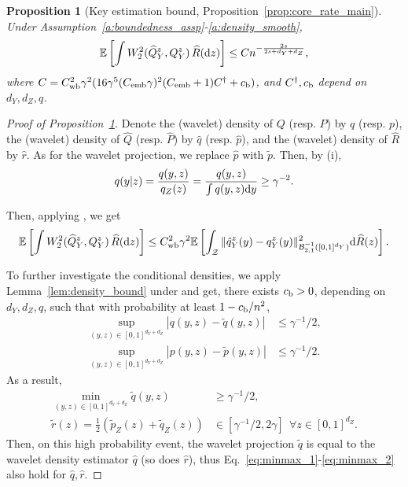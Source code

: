 \documentclass{article}
\theoremstyle{plain}
\newtheorem{proposition}{Proposition}[section]
\theoremstyle{definition}
\def\EE{\mathbb{E}}
\def\QQ{Q}
\def\calB{\mathcal{B}}
\def\calZ{\mathcal{Z}}
\theoremstyle{plain}
\newcommand{\diff}{{\rm d}}
\def\EE{\mathbb{E}}
\def\calB{\mathcal{B}}
\def\calZ{\mathcal{Z}}
\begin{document}
\begin{proposition}[Key estimation bound, Proposition~\ref{prop:core_rate_main}]\label{prop:core_rate}
Under Assumption~\ref{a:boundedness_assp}-\ref{a:density_smooth},
    \[
        \EE\left[\int W^2_2(\widehat \QQ_Y^z, \QQ_Y^z) \, \widehat R(\diff z)\right] \leq C n^{-\frac{2s}{2s+d_Y+d_Z}},
    \]
    where $C = C_{\textup{wb}}^2 \gamma^2(16 \gamma^5  (C_{\textup{emb}} \gamma)^2 (C_{\textup{emb}} + 1)C^\dagger + c_{\textup{b}})$, and $C^\dagger ,c_{\textup{b}}$ depend on $d_Y, d_Z, q$.
\end{proposition}

\begin{proof}[Proof of Proposition~\ref{prop:core_rate}]
    Denote the (wavelet) density of $Q$ (resp. $P$) by $q$ (resp. $p$), the (wavelet) density of $\widehat Q$ (resp. $\widehat P$) by $\hat q$ (resp. $\hat p$), and the (wavelet) density of $\widehat R$ by $\hat r$. As for the wavelet projection, we replace $\hat p$ with $\tilde p$. Then, by (i),
    \[
        q(y|z) = \frac{q(y,z)}{q_Z(z)} = \frac{q(y,z)}{\int q(y,z) \diff y} \geq \gamma^{-2}.
    \]    
    
    Then, applying , we get
    \[
        \EE\left[\int W^2_2(\widehat \QQ_Y^z, \QQ_Y^z) \, \widehat R(\diff z)\right] \leq C_{\textup{wb}}^2 \gamma^2 \EE\left[\int_{\calZ} \|\hat q_Y^z(y) - q_Y^z(y)\|^2_{\calB_{2,1}^{-1}([0,1]^{d_Y})} \diff \widehat R(z)\right].
    \]

    To further investigate the conditional densities, we apply Lemma~\ref{lem:density_bound} under  and get, there exists $c_{\textup{b}} > 0$, depending on $d_Y, d_Z, q$, such that with probability at least $1 - c_{\textup{b}} / n^2$, 
    \begin{align*}
        \sup_{(y,z) \in [0,1]^{d_Y + d_Z}} |q(y, z) - \tilde q(y, z)| &\leq \gamma^{-1}/2,\\
        \sup_{(y,z) \in [0,1]^{d_Y + d_Z}} |p(y, z) - \tilde p(y, z)| &\leq \gamma^{-1}/2.
    \end{align*}
    As a result,
    \begin{align}
        \min_{(y,z) \in [0,1]^{d_Y + d_Z}} \tilde q(y,z) &\geq \gamma^{-1}/2, \label{eq:minmax_1}\\
        \tilde r(z) = \frac{1}{2}( \tilde p_Z(z) + \tilde q_Z(z)) & \in [\gamma^{-1}/2, 2\gamma] \ \  \forall z \in [0,1]^{d_Z}. \label{eq:minmax_2}
    \end{align}
    Then, on this high probability event, the wavelet projection $\tilde q$ is equal to the wavelet density estimator $\hat q$ (so does $\hat r$), thus Eq.~\eqref{eq:minmax_1}-\eqref{eq:minmax_2} also hold for $\hat q, \hat r$.
    

\end{proof}
\end{document}
